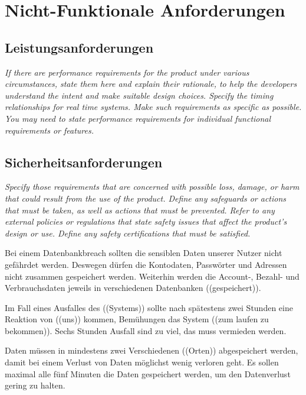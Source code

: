 \section{Nicht-Funktionale Anforderungen}

\subsection{Leistungsanforderungen}
\textit{If there are performance requirements for the product under various 
circumstances, state them here and explain their rationale, 
to help the developers understand the intent and make suitable design choices. 
Specify the timing relationships for real time systems. 
Make such requirements as specific as possible. 
You may need to state performance requirements 
for individual functional requirements or features.}


\subsection{Sicherheitsanforderungen}
\textit{Specify those requirements that are concerned 
with possible loss, damage, or harm that could result from the use of the product. 
Define any safeguards or actions that must be taken, as well as actions that must be prevented. 
Refer to any external policies or regulations that state safety issues that affect the product’s design or use. 
Define any safety certifications that must be satisfied.}


Bei einem Datenbankbreach sollten die sensiblen Daten unserer Nutzer nicht 
gefährdet werden.
Deswegen dürfen die Kontodaten, Passwörter und Adressen nicht zusammen gespeichert werden.
Weiterhin werden die Account-, Bezahl- und Verbrauchsdaten jeweils in verschiedenen Datenbanken ((gespeichert)).

Im Fall eines Ausfalles des ((Systems)) sollte nach spätestens zwei Stunden
eine Reaktion von ((uns)) kommen, 
Bemühungen das System ((zum laufen zu bekommen)).
Sechs Stunden Ausfall sind zu viel, das muss vermieden werden.

Daten müssen in mindestens zwei Verschiedenen ((Orten)) 
abgespeichert werden, 
damit bei einem Verlust von Daten %
möglichst wenig verloren geht.
Es sollen maximal alle fünf Minuten die Daten gespeichert werden, 
um den Datenverlust gering zu halten. %




